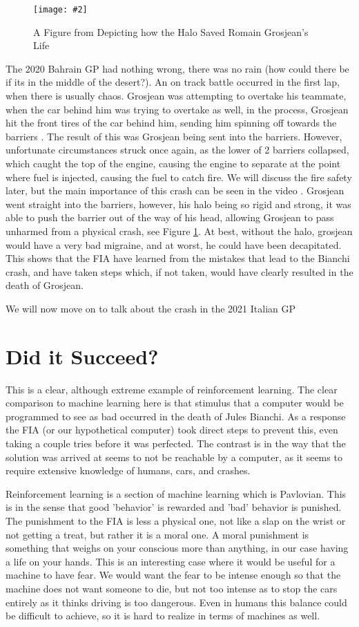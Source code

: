 \documentclass[letterpaper, 12pt]{article}
\numberwithin{figure}{section}
\newcommand{\figref}[4]
{
  \begin{figure}[H]
    \centering
    \texttt{[image: \#2]}
    \caption{#3}
    #4
  \end{figure}
}
\begin{document}
\figref{5}{grosjeancrash}{A Figure from \cite{grosjeancrashsim} Depicting how the Halo Saved Romain Grosjean's Life}{\label{fig:2}}
The 2020 Bahrain GP had nothing wrong, there was no rain (how could there be if its in the middle of the desert?). An on track battle occurred in the first lap, when there is usually chaos. Grosjean was attempting to overtake his teammate, when the car behind him was trying to overtake as well, in the process, Grosjean hit the front tires of the car behind him, sending him spinning off towards the barriers \cite{grosjeanvideo}. The result of this was Grosjean being sent into the barriers. However, unfortunate circumstances struck once again, as the lower of 2 barriers collapsed, which caught the top of the engine, causing the engine to separate at the point where fuel is injected, causing the fuel to catch fire. We will discuss the fire safety later, but the main importance of this crash can be seen in the video \cite{grosjeancrashsim}. Grosjean went straight into the barriers, however, his halo being so rigid and strong, it was able to push the barrier out of the way of his head, allowing Grosjean to pass unharmed from a physical crash, see Figure \ref{fig:2}. At best, without the halo, grosjean would have a very bad migraine, and at worst, he could have been decapitated. This shows that the FIA have learned from the mistakes that lead to the Bianchi crash, and have taken steps which, if not taken, would have clearly resulted in the death of Grosjean.

We will now move on to talk about the crash in the 2021 Italian GP
\section{Did it Succeed?}
This is a clear, although extreme example of reinforcement learning. The clear comparison to machine learning here is that stimulus that a computer would be programmed to see as bad occurred in the death of Jules Bianchi. As a response the FIA (or our hypothetical computer) took direct steps to prevent this, even taking a couple tries before it was perfected. The contrast is in the way that the solution was arrived at seems to not be reachable by a computer, as it seems to require extensive knowledge of humans, cars, and crashes.

Reinforcement learning is a section of machine learning which is Pavlovian. This is in the sense that good 'behavior' is rewarded and 'bad' behavior is punished. The punishment to the FIA is less a physical one, not like a slap on the wrist or not getting a treat, but rather it is a moral one. A moral punishment is something that weighs on your conscious more than anything, in our case having a life on your hands. This is an interesting case where it would be useful for a machine to have fear. We would want the fear to be intense enough so that the machine does not want someone to die, but not too intense as to stop the cars entirely as it thinks driving is too dangerous. Even in humans this balance could be difficult to achieve, so it is hard to realize in terms of machines as well.
\end{document}
